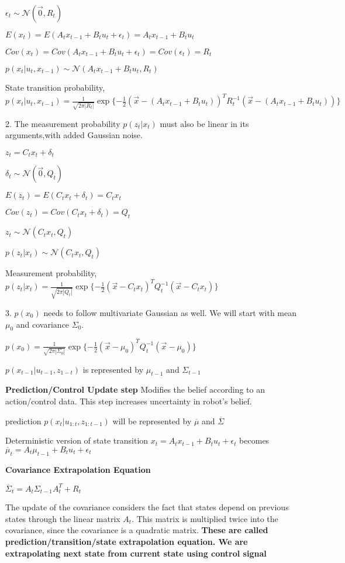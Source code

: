 \documentclass{article}
\begin{document}
$\epsilon_t \sim \mathcal{N}(\vec{0},R_t)$

$E(x_t) = E(A_t x_{t-1} + B_t u_t + \epsilon_t) = A_t x_{t-1} + B_t u_t$

$Cov(x_t) = Cov(A_t x_{t-1} + B_t u_t + \epsilon_t) = Cov(\epsilon_t) = R_t$

$p(x_t | u_t , x_{t-1}) \sim \mathcal{N}(A_t x_{t-1} + B_t u_t,R_t)$

State transition probability,
$p(x_t | u_t , x_{t-1}) = \frac{1}{\sqrt{2\pi |R_t|}}\exp\{-\frac{1}{2}(\vec{x} - (A_t x_{t-1} + B_t u_t))^TR_t^{-1}(\vec{x} - (A_t x_{t-1} + B_t u_t))\}$

2.
The measurement probability $p(z_t | x_t)$ must also be linear in its arguments,with added Gaussian noise.

$z_t = C_t x_t + \delta_t$

$\delta_t \sim \mathcal{N}(\vec{0},Q_t)$

$E(z_t) = E(C_t x_t + \delta_t) = C_t x_t$

$Cov(z_t) = Cov(C_t x_t + \delta_t) = Q_t$

$z_t \sim \mathcal{N}(C_t x_t,Q_t)$

$p(z_t | x_t) \sim \mathcal{N}(C_t x_t,Q_t)$

Measurement probability,
$p(z_t | x_t) = \frac{1}{\sqrt{2\pi |Q_t|}}\exp\{-\frac{1}{2}(\vec{x} - C_t x_t)^TQ_t^{-1}(\vec{x} - C_t x_t)\}$

3.
$p(x_0)$ needs to follow multivariate Gaussian as well. We will start with mean $\mu_0$ and covariance $\Sigma_0$.

$p(x_0) = \frac{1}{\sqrt{2\pi |\Sigma_0|}}\exp\{-\frac{1}{2}(\vec{x} - \mu_0)^TQ_t^{-1}(\vec{x} - \mu_0)\}$

$p(x_{t-1} | u_{t-1}, z_{1-t})$ is represented by $\mu_{t-1}$ and $\Sigma_{t-1}$

\textbf{Prediction/Control Update step} 
Modifies the belief according to an action/control data. This step increases uncertainty in robot's belief.

prediction $p(x_t | u_{1:t}, z_{1:t-1})$ will be represented by $\overline{\mu}$ and $\overline{\Sigma}$

Deterministic version of state transition
$x_t = A_t x_{t-1} + B_t u_t + \epsilon_t$ becomes $\overline{\mu}_t = A_t \mu_{t-1} + B_t u_t + \epsilon_t$

\textbf{Covariance Extrapolation Equation}

$\overline{\Sigma}_t = A_t\Sigma_{t-1}A_t^T + R_t$

The update of the covariance considers the fact that states depend on previous states through the linear matrix $A_t$. This matrix is multiplied twice into the covariance, since the covariance is a quadratic matrix.
\textbf{These are called prediction/transition/state extrapolation equation. We are extrapolating next state from current state using control signal}
\end{document}
